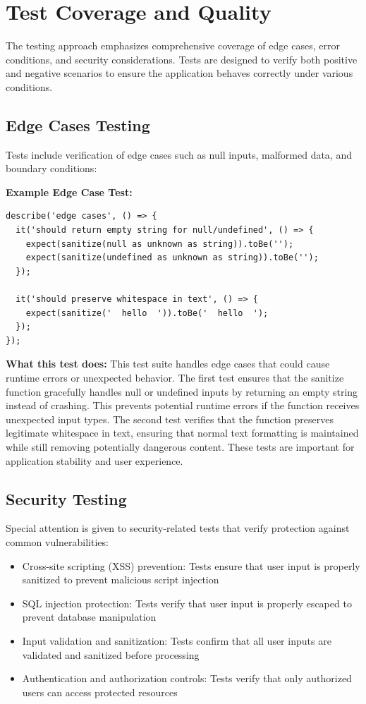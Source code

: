 \section{Test Coverage and Quality}

The testing approach emphasizes comprehensive coverage of edge cases, error conditions, and security considerations. Tests are designed to verify both positive and negative scenarios to ensure the application behaves correctly under various conditions.

\subsection{Edge Cases Testing}

Tests include verification of edge cases such as null inputs, malformed data, and boundary conditions:

\textbf{Example Edge Case Test:}
\begin{verbatim}
describe('edge cases', () => {
  it('should return empty string for null/undefined', () => {
    expect(sanitize(null as unknown as string)).toBe('');
    expect(sanitize(undefined as unknown as string)).toBe('');
  });

  it('should preserve whitespace in text', () => {
    expect(sanitize('  hello  ')).toBe('  hello  ');
  });
});
\end{verbatim}

\textbf{What this test does:} This test suite handles edge cases that could cause runtime errors or unexpected behavior. The first test ensures that the sanitize function gracefully handles null or undefined inputs by returning an empty string instead of crashing. This prevents potential runtime errors if the function receives unexpected input types. The second test verifies that the function preserves legitimate whitespace in text, ensuring that normal text formatting is maintained while still removing potentially dangerous content. These tests are important for application stability and user experience.

\subsection{Security Testing}

Special attention is given to security-related tests that verify protection against common vulnerabilities:

\begin{itemize}
    \item Cross-site scripting (XSS) prevention: Tests ensure that user input is properly sanitized to prevent malicious script injection
    \item SQL injection protection: Tests verify that user input is properly escaped to prevent database manipulation
    \item Input validation and sanitization: Tests confirm that all user inputs are validated and sanitized before processing
    \item Authentication and authorization controls: Tests verify that only authorized users can access protected resources
\end{itemize}

